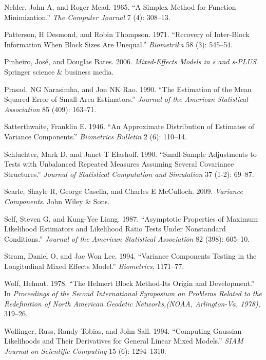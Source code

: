 \documentclass{article}
\newlength{\cslhangindent}
\newlength{\cslentryspacingunit} %
\newenvironment{CSLReferences}[2] %
 {%
  \setlength{\parindent}{0pt}
  \ifodd #1
  \let\oldpar\par
  \def\par{\hangindent=\cslhangindent\oldpar}
  \fi
  \setlength{\parskip}{#2\cslentryspacingunit}
 }%
 {}
\begin{document}
\begin{CSLReferences}{1}{0}
\leavevmode\hypertarget{ref-nelder1965simplex}{}%
Nelder, John A, and Roger Mead. 1965. {``A Simplex Method for Function
Minimization.''} \emph{The Computer Journal} 7 (4): 308--13.

\leavevmode\hypertarget{ref-patterson1971recovery}{}%
Patterson, H Desmond, and Robin Thompson. 1971. {``Recovery of
Inter-Block Information When Block Sizes Are Unequal.''}
\emph{Biometrika} 58 (3): 545--54.

\leavevmode\hypertarget{ref-pinheiro2006mixed}{}%
Pinheiro, José, and Douglas Bates. 2006. \emph{Mixed-Effects Models in s
and s-PLUS}. Springer science \& business media.

\leavevmode\hypertarget{ref-prasad1990estimation}{}%
Prasad, NG Narasimha, and Jon NK Rao. 1990. {``The Estimation of the
Mean Squared Error of Small-Area Estimators.''} \emph{Journal of the
American Statistical Association} 85 (409): 163--71.

\leavevmode\hypertarget{ref-satterthwaite1946approximate}{}%
Satterthwaite, Franklin E. 1946. {``An Approximate Distribution of
Estimates of Variance Components.''} \emph{Biometrics Bulletin} 2 (6):
110--14.

\leavevmode\hypertarget{ref-schluchter1990small}{}%
Schluchter, Mark D, and Janet T Elashoff. 1990. {``Small-Sample
Adjustments to Tests with Unbalanced Repeated Measures Assuming Several
Covariance Structures.''} \emph{Journal of Statistical Computation and
Simulation} 37 (1-2): 69--87.

\leavevmode\hypertarget{ref-searle2009variance}{}%
Searle, Shayle R, George Casella, and Charles E McCulloch. 2009.
\emph{Variance Components}. John Wiley \& Sons.

\leavevmode\hypertarget{ref-self1987asymptotic}{}%
Self, Steven G, and Kung-Yee Liang. 1987. {``Asymptotic Properties of
Maximum Likelihood Estimators and Likelihood Ratio Tests Under
Nonstandard Conditions.''} \emph{Journal of the American Statistical
Association} 82 (398): 605--10.

\leavevmode\hypertarget{ref-stram1994variance}{}%
Stram, Daniel O, and Jae Won Lee. 1994. {``Variance Components Testing
in the Longitudinal Mixed Effects Model.''} \emph{Biometrics}, 1171--77.

\leavevmode\hypertarget{ref-wolf1978helmert}{}%
Wolf, Helmut. 1978. {``The Helmert Block Method-Its Origin and
Development.''} In \emph{Proceedings of the Second International
Symposium on Problems Related to the Redefinition of North American
Geodetic Networks,(NOAA, Arlington-Va, 1978)}, 319--26.

\leavevmode\hypertarget{ref-wolfinger1994computing}{}%
Wolfinger, Russ, Randy Tobias, and John Sall. 1994. {``Computing
Gaussian Likelihoods and Their Derivatives for General Linear Mixed
Models.''} \emph{SIAM Journal on Scientific Computing} 15 (6):
1294--1310.

\end{CSLReferences}



\end{document}

